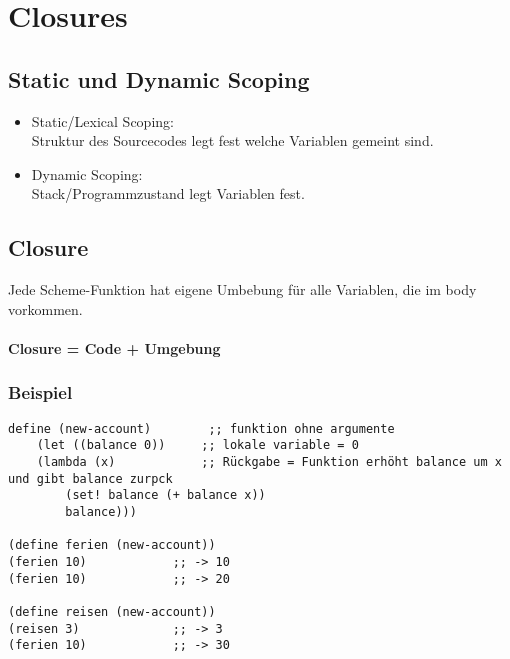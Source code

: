 \section{Closures}

\subsection{Static und Dynamic Scoping}
\begin{itemize}
    \item Static/Lexical Scoping: \\
          Struktur des Sourcecodes legt fest welche Variablen gemeint sind.
    \item Dynamic Scoping: \\
          Stack/Programmzustand legt Variablen fest.
\end{itemize}

\subsection{Closure}
Jede Scheme-Funktion hat eigene Umbebung für alle Variablen,
die im body vorkommen. \\\\
\textbf{Closure = Code + Umgebung}

\subsubsection{Beispiel}
\lstset{language=Scheme,style=customstyle}
\begin{lstlisting}
define (new-account)        ;; funktion ohne argumente
    (let ((balance 0))     ;; lokale variable = 0
    (lambda (x)            ;; Rückgabe = Funktion erhöht balance um x und gibt balance zurpck
        (set! balance (+ balance x))
        balance)))

(define ferien (new-account))
(ferien 10)            ;; -> 10
(ferien 10)            ;; -> 20

(define reisen (new-account))
(reisen 3)             ;; -> 3
(ferien 10)            ;; -> 30
\end{lstlisting}
